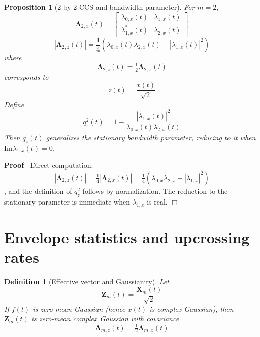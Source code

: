 \documentclass{article}
\newcommand{\tmmathbf}[1]{\ensuremath{\boldsymbol{#1}}}
\newenvironment{proof}{\noindent\textbf{Proof\ }}{\hspace*{\fill}$\Box$\medskip}
\newtheorem{definition}{Definition}
\newtheorem{proposition}{Proposition}
\begin{document}
\begin{proposition}
  [2-by-2 CCS and bandwidth parameter]\label{prop:2x2} For $m = 2$,
  \begin{equation}
    \label{eq:Lambda2} \tmmathbf{\Lambda}_{2, x} (t) = \left[
    \begin{array}{cc}
      \lambda_{0, x} (t) & \lambda_{1, x} (t)\\
      \lambda_{1, x}^{\ast} (t) & \lambda_{2, x} (t)
    \end{array} \right]
  \end{equation}
  \begin{equation}
    |\tmmathbf{\Lambda}_{2, z} (t) | = \frac{1}{4}  (\lambda_{0, x} (t)
    \lambda_{2, x} (t) - | \lambda_{1, x} (t) |^2)
  \end{equation}
  where
  \begin{equation}
    \tmmathbf{\Lambda}_{2, z} (t) = \tfrac{1}{2} \tmmathbf{\Lambda}_{2, x} (t)
  \end{equation}
  corresponds to
  \begin{equation}
    z (t) = \frac{x (t)}{\sqrt{2}}
  \end{equation}
  Define
  \begin{equation}
    q_z^2 (t) = 1 - \frac{| \lambda_{1, x} (t) |^2}{\lambda_{0, x} (t)
    \lambda_{2, x} (t)}
  \end{equation}
  Then $q_z (t)$ generalizes the stationary bandwidth parameter, reducing to
  it when $\mathrm{Im} \lambda_{1, x} (t) = 0$.
\end{proposition}

\begin{proof}
  Direct computation:
  \begin{equation}
    |\tmmathbf{\Lambda}_{2, z} (t) | = \tfrac{1}{4} |\tmmathbf{\Lambda}_{2, x}
    (t) | = \tfrac{1}{4} (\lambda_{0, x} \lambda_{2, x} - | \lambda_{1, x}
    |^2)
  \end{equation}
  , and the definition of $q_z^2$ follows by normalization. The reduction to
  the stationary parameter is immediate when $\lambda_{1, x}$ is real.
\end{proof}

\section{Envelope statistics and upcrossing rates}

\begin{definition}
  [Effective vector and Gaussianity] Let
  \begin{equation}
    \tmmathbf{Z}_m (t) = \frac{\tmmathbf{X}_m (t)}{\sqrt{2}}
  \end{equation}
  If $f (t)$ is zero-mean Gaussian (hence $x (t)$ is complex Gaussian), then
  $\tmmathbf{Z}_m (t)$ is zero-mean complex Gaussian with covariance
  \begin{equation}
    \tmmathbf{\Lambda}_{m, z} (t) = \tfrac{1}{2} \tmmathbf{\Lambda}_{m, x} (t)
  \end{equation}
\end{definition}
\end{document}
